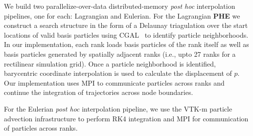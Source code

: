 We build two parallelize-over-data distributed-memory \textit{post hoc} interpolation pipelines, one for each: Lagrangian and Eulerian.
%
%
%
For the Lagrangian \textbf{PHE} we construct a search structure in the form of a Delaunay triagulation over the start locations of valid basis particles using CGAL~\cite{fabri2011cgal} to identify particle neighborhoods.
%
%
%
%
%
%
%
%
%
In our implementation, each rank loads basis particles of the rank itself as well as basis particles generated by spatially adjacent ranks (i.e., upto 27 ranks for a rectilinear simulation grid).
%
%
%
%
%
Once a particle neighborhood is identified, barycentric coordinate interpolation is used to calculate the displacement of $p$.  
%
%
Our implementation uses MPI to communicate particles across ranks and continue the integration of trajectories across node boundaries.

For the Eulerian \textit{post hoc} interpolation pipeline, we use the VTK-m particle advection infrastructure to perform RK4 integration and MPI for communication of particles across ranks.
%
